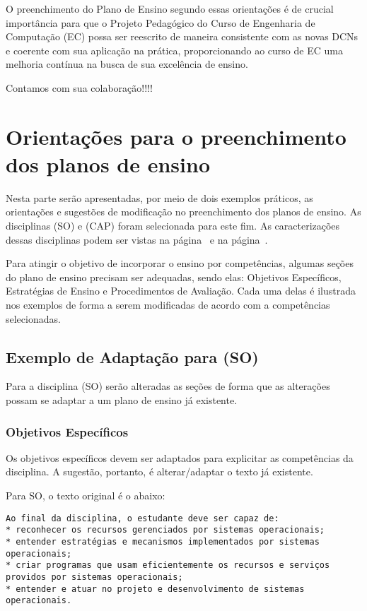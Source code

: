 \documentclass[12pt, oneside]{book}
\begin{document}
O preenchimento do Plano de Ensino segundo essas orientações é de crucial importância para que o Projeto Pedagógico do Curso de Engenharia de Computação (EC) possa ser reescrito de maneira consistente com as novas DCNs e coerente com sua aplicação na prática, proporcionando ao curso de EC uma melhoria contínua na busca de sua excelência de ensino.

Contamos com sua colaboração!!!!


\chapter{Orientações para o preenchimento dos planos de ensino}

Nesta parte serão apresentadas, por meio de dois exemplos práticos, as orientações e sugestões de modificação no preenchimento dos planos de ensino. As disciplinas  (SO) e  (CAP) foram selecionada para este fim. As caracterizações dessas disciplinas podem ser vistas na página~\pageref{so} e na página~\pageref{cap}.

Para atingir o objetivo de incorporar o ensino por competências, algumas seções do plano de ensino precisam ser adequadas, sendo elas: Objetivos Específicos, Estratégias de Ensino e Procedimentos de Avaliação. Cada uma delas é ilustrada nos exemplos de forma a serem modificadas de acordo com a competências selecionadas.


\section{Exemplo de Adaptação para  (SO)}

Para a disciplina  (SO) serão alteradas as seções de forma que as alterações possam se adaptar a um plano de ensino já existente. 

\subsection*{Objetivos Específicos}
Os objetivos específicos devem ser adaptados para explicitar as competências da disciplina. A sugestão, portanto, é alterar/adaptar o texto já existente.

Para SO, o texto original é o abaixo:
\begin{lstlisting}
Ao final da disciplina, o estudante deve ser capaz de:
* reconhecer os recursos gerenciados por sistemas operacionais;
* entender estratégias e mecanismos implementados por sistemas operacionais;
* criar programas que usam eficientemente os recursos e serviços providos por sistemas operacionais;
* entender e atuar no projeto e desenvolvimento de sistemas operacionais.
\end{lstlisting}
\end{document}
